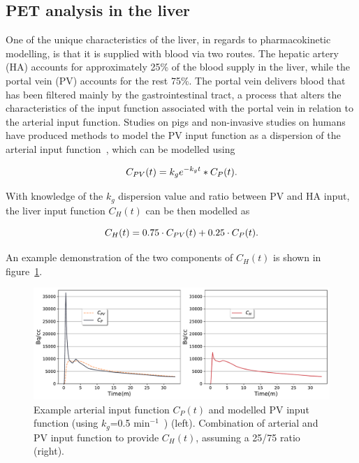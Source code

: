 \subsection{PET analysis in the liver}
\label{liver_PV_theory}
One of the unique characteristics of the liver, in regards to pharmacokinetic modelling, is that it is supplied with blood via two routes. The hepatic artery (HA) accounts for approximately 25\% of the blood supply in the liver, while the portal vein (PV) accounts for the rest 75\%. The portal vein delivers blood that has been filtered mainly by the gastrointestinal tract, a process that alters the characteristics of the input function associated with the portal vein in relation to the arterial input function. 
Studies on pigs and non-invasive studies on humans have produced methods to model the PV input function as a dispersion of the arterial input function~\cite{Kudomi2008,Winterdahl2011}, which can be modelled using 

\begin{equation} 
{C_{PV}}(t)  = {k_g} e^{-k_g t} \ast C_P(t)   \\ . \\
\label{eqn:PortalVein}
\end{equation}

With knowledge of the $k_g$ dispersion value and ratio between PV and HA input, the liver input function ${C_{H}}(t)$ can be then modelled as

\begin{equation} 
{C_{H}}(t)  = 0.75 \cdot C_{PV}(t) + 0.25 \cdot C_{P}(t)  \\ . \\
\label{eqn:HepaticInput}
\end{equation}

An example demonstration of the two components of ${C_{H}}(t)$ is shown in figure~\ref{fig_2_2:LiverDualInputFunction}.

\begin{figure} [h!]
\centering
\includegraphics[scale=0.53,angle=0]{2_Theory_Methods/figures/2_2_LiverDualInputFunction.pdf}
\caption{Example arterial input function $C_{P}(t)$ and modelled PV input function (using $k_g$=0.5 min$^{-1}$~\cite{Kudomi2008}) (left). Combination of arterial and PV input function to provide ${C_{H}}(t)$, assuming a 25/75 ratio (right).} 
\label{fig_2_2:LiverDualInputFunction}
\end{figure} 

